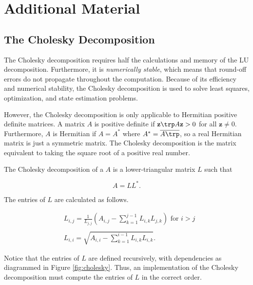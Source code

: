 \newpage

\section*{Additional Material} %

\subsection*{The Cholesky Decomposition} %

The Cholesky decomposition requires half the calculations and memory of the LU decomposition.
Furthermore, it is \emph{numerically stable}, which means that round-off errors do not propagate throughout the computation.
Because of its efficiency and numerical stability, the Cholesky decomposition is used to solve least squares, optimization, and state estimation problems.

However, the Cholesky decomposition is only applicable to Hermitian positive definite matrices.
A matrix $A$ is positive definite if  $\mathbf{z}\trp A\mathbf{z} > 0$ for all $\mathbf{z} \neq 0$.
Furthermore, $A$ is Hermitian if $A = A^*$ where $A^* = \overline{A\trp }$, so a real Hermitian matrix is just a symmetric matrix.
The Cholesky decomposition is the matrix equivalent to taking the square root of a positive real number.

The Cholesky decomposition of a $A$ is a lower-triangular matrix $L$ such that

\begin{equation*}
 A = LL^*.
\end{equation*}

The entries of $L$ are calculated as follows.

\begin{align*}
&L_{i,j} = \frac{1}{L_{j,j}}\left(A_{i,j} -\sum_{k=1}^{j-1}{L_{i,k}L_{j,k}}\right) \mbox{ for $i>j$} \\ \\
&L_{i,i} = \sqrt{A_{i,i} - \sum_{k=1}^{i-1}{L_{i,k}L_{i,k}}}.
\end{align*}

Notice that the entries of $L$ are defined recursively, with dependencies as diagrammed in Figure \ref{fig:cholesky}.
Thus, an implementation of the Cholesky decomposition must compute the entries of $L$ in the correct order.

